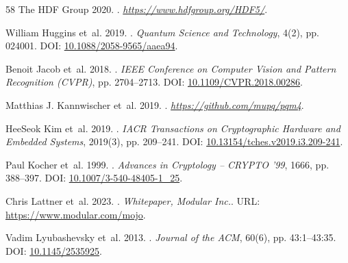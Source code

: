 \documentclass[letterpaper]{article}
\begin{document}
\begin{thebibliography}{58}
{The HDF Group} 2020.
.
\newblock \emph{\url{https://www.hdfgroup.org/HDF5/}}.

William Huggins et~al. 2019.
.
\newblock \emph{Quantum Science and Technology}, 4(2), pp. 024001.
\newblock DOI: \href{https://doi.org/10.1088/2058-9565/aaea94}{10.1088/2058-9565/aaea94}.

Benoit Jacob et~al. 2018.
.
\newblock \emph{IEEE Conference on Computer Vision and Pattern Recognition (CVPR)}, pp. 2704--2713.
\newblock DOI: \href{https://doi.org/10.1109/CVPR.2018.00286}{10.1109/CVPR.2018.00286}.

Matthias J. Kannwischer et~al. 2019.
.
\newblock \emph{\url{https://github.com/mupq/pqm4}}.

HeeSeok Kim et~al. 2019.
.
\newblock \emph{IACR Transactions on Cryptographic Hardware and Embedded Systems}, 2019(3), pp. 209--241.
\newblock DOI: \href{https://doi.org/10.13154/tches.v2019.i3.209-241}{10.13154/tches.v2019.i3.209-241}.

Paul Kocher et~al. 1999.
.
\newblock \emph{Advances in Cryptology -- CRYPTO '99}, 1666, pp. 388--397.
\newblock DOI: \href{https://doi.org/10.1007/3-540-48405-1_25}{10.1007/3-540-48405-1_25}.

Chris Lattner et~al. 2023.
.
\newblock \emph{Whitepaper, Modular Inc.}.
\newblock URL: \url{https://www.modular.com/mojo}.

Vadim Lyubashevsky et~al. 2013.
.
\newblock \emph{Journal of the ACM}, 60(6), pp. 43:1--43:35.
\newblock DOI: \href{https://doi.org/10.1145/2535925}{10.1145/2535925}.


\end{thebibliography}
\end{document}
